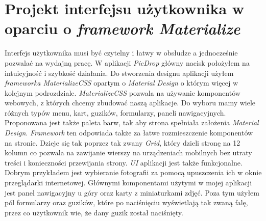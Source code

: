 \documentclass[openright]{xmgr}
\begin{document}
\section{Projekt interfejsu użytkownika w oparciu o \textit{framework Materialize}}
	Interfejs użytkownika musi być czytelny i łatwy w obsłudze a jednocześnie pozwalać na wydajną pracę. W aplikacji \textit{PicDrop} główny nacisk położyłem na intuicyjność i szybkość działania. Do stworzenia designu aplikacji użyłem \textit{frameworka MaterializeCSS} opartym o \textit{Material Design} o którym więcej w kolejnym podrozdziale. \textit{MaterializeCSS} pozwala na używanie komponentów webowych, z których chcemy zbudować naszą aplikacje. Do wyboru mamy wiele różnych typów menu, kart, guzików, formularzy, paneli nawigacyjnych. Proponowana jest także paleta barw, tak aby strona spełniała założenia \textit{Material Design}. \textit{Framework} ten odpowiada także za łatwe rozmieszczenie komponentów na stronie. Dzieje się tak poprzez tak zwany \textit{Grid}, który dzieli stronę na 12 kolumn co pozwala na zawijanie wierszy na urządzeniach mobilnych bez utraty treści i konieczności przewijania strony. \textit{UI} aplikacji jest także funkcjonalne. Dobrym przykładem jest wybieranie fotografii za pomocą upuszczenia ich w oknie przeglądarki internetowej. Głównymi komponentami użytymi w mojej aplikacji jest panel nawigacyjny u góry oraz karty z miniaturkami zdjęć. Poza tym użyłem pól formularzy oraz guzików, które po naciśnięciu wyświetlają tak zwaną falę, przez co użytkownik wie, że dany guzik został naciśnięty.
\end{document}
